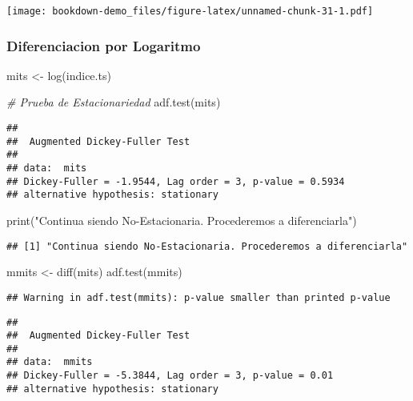 \documentclass[
]{book}
\newenvironment{Shaded}{\begin{snugshade}}{\end{snugshade}}
\newcommand{\CommentTok}[1]{\textcolor[rgb]{0.56,0.35,0.01}{\textit{#1}}}
\newcommand{\FunctionTok}[1]{\textcolor[rgb]{0.00,0.00,0.00}{#1}}
\newcommand{\NormalTok}[1]{#1}
\newcommand{\OtherTok}[1]{\textcolor[rgb]{0.56,0.35,0.01}{#1}}
\newcommand{\StringTok}[1]{\textcolor[rgb]{0.31,0.60,0.02}{#1}}
\begin{document}
\texttt{[image: bookdown-demo\_files/figure-latex/unnamed-chunk-31-1.pdf]}

\hypertarget{diferenciacion-por-logaritmo}{%
\subsubsection{Diferenciacion por Logaritmo}\label{diferenciacion-por-logaritmo}}

\begin{Shaded}
\begin{Highlighting}[]
\NormalTok{mits }\OtherTok{\textless{}{-}} \FunctionTok{log}\NormalTok{(indice.ts)}

\CommentTok{\# Prueba de Estacionariedad}
\FunctionTok{adf.test}\NormalTok{(mits)}
\end{Highlighting}
\end{Shaded}

\begin{verbatim}
## 
##  Augmented Dickey-Fuller Test
## 
## data:  mits
## Dickey-Fuller = -1.9544, Lag order = 3, p-value = 0.5934
## alternative hypothesis: stationary
\end{verbatim}

\begin{Shaded}
\begin{Highlighting}[]
\FunctionTok{print}\NormalTok{(}\StringTok{"Continua siendo No{-}Estacionaria. Procederemos a diferenciarla"}\NormalTok{)}
\end{Highlighting}
\end{Shaded}

\begin{verbatim}
## [1] "Continua siendo No-Estacionaria. Procederemos a diferenciarla"
\end{verbatim}

\begin{Shaded}
\begin{Highlighting}[]
\NormalTok{mmits }\OtherTok{\textless{}{-}} \FunctionTok{diff}\NormalTok{(mits)}
\FunctionTok{adf.test}\NormalTok{(mmits)}
\end{Highlighting}
\end{Shaded}

\begin{verbatim}
## Warning in adf.test(mmits): p-value smaller than printed p-value
\end{verbatim}

\begin{verbatim}
## 
##  Augmented Dickey-Fuller Test
## 
## data:  mmits
## Dickey-Fuller = -5.3844, Lag order = 3, p-value = 0.01
## alternative hypothesis: stationary
\end{verbatim}
\end{document}
